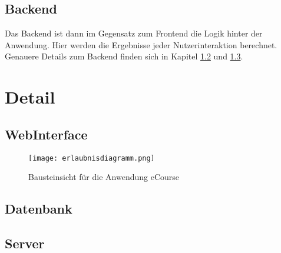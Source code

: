 \subsection{Backend}
Das \gls{Backend} ist dann im Gegensatz zum \gls{Frontend} die Logik hinter der Anwendung. Hier werden die Ergebnisse jeder Nutzerinteraktion berechnet. Genauere Details zum \gls{Backend} finden sich in Kapitel \ref{sec:Datenbank} und \ref{sec:Server}.

\section{Detail}

\subsection{WebInterface}
\begin{figure}[H]
\centering
\texttt{[image: erlaubnisdiagramm.png]}
\caption{Bausteinsicht für die Anwendung eCourse}
\label{fib:erlaubnis}
\end{figure}

\subsection{Datenbank}
\label{sec:Datenbank}

\subsection{Server}
\label{sec:Server}